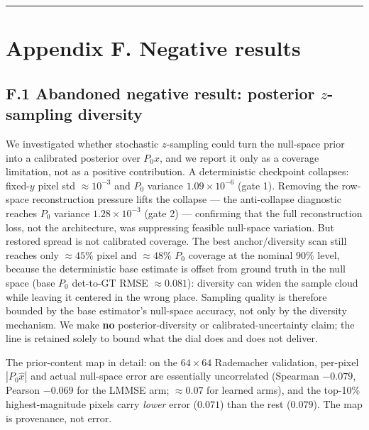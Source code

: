 \documentclass[11pt]{article}
\begin{document}
\medskip\hrule\medskip

\section*{Appendix F. Negative results}

\subsection*{F.1 Abandoned negative result: posterior $z$-sampling diversity}

We investigated whether stochastic $z$-sampling could turn the null-space prior into a calibrated posterior over $P_0 x$, and we report it only as a coverage limitation, not as a positive contribution. A deterministic checkpoint collapses: fixed-$y$ pixel std $\approx 10^{-3}$ and $P_0$ variance $1.09\times10^{-6}$ (gate 1). Removing the row-space reconstruction pressure lifts the collapse --- the anti-collapse diagnostic reaches $P_0$ variance $1.28\times10^{-3}$ (gate 2) --- confirming that the full reconstruction loss, not the architecture, was suppressing feasible null-space variation. But restored spread is not calibrated coverage. The best anchor/diversity scan still reaches only $\approx 45\%$ pixel and $\approx 48\%$ $P_0$ coverage at the nominal $90\%$ level, because the deterministic base estimate is offset from ground truth in the null space (base $P_0$ det-to-GT RMSE $\approx 0.081$): diversity can widen the sample cloud while leaving it centered in the wrong place. Sampling quality is therefore bounded by the base estimator's null-space accuracy, not only by the diversity mechanism. We make \textbf{no} posterior-diversity or calibrated-uncertainty claim; the line is retained solely to bound what the dial does and does not deliver.

The prior-content map in detail: on the $64\times64$ Rademacher validation, per-pixel $|P_0\hat{x}|$ and actual null-space error are essentially uncorrelated (Spearman $-0.079$, Pearson $-0.069$ for the LMMSE arm; $\approx 0.07$ for learned arms), and the top-10\% highest-magnitude pixels carry \textit{lower} error ($0.071$) than the rest ($0.079$). The map is provenance, not error.
\end{document}
